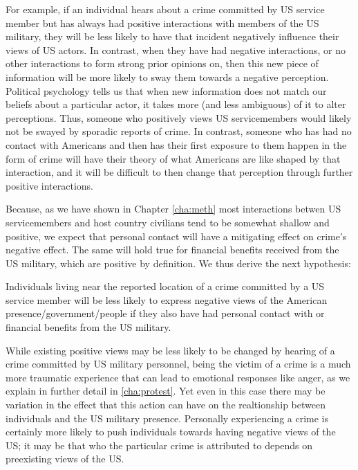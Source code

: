 For example, if an individual hears about a crime committed by US service member but has always had positive interactions with members of the US military, they will be less likely to have that incident negatively influence their views of US actors. In contrast, when they have had negative interactions, or no other interactions to form strong prior opinions on, then this new piece of information will be more likely to sway them towards a negative perception. Political psychology tells us that when new information does not match our beliefs about a particular actor, it takes more  (and less ambiguous) of it to alter perceptions. Thus, someone who positively views US servicemembers would likely not be swayed by sporadic reports of crime. In contrast, someone who has had no contact with Americans and then has their first exposure to them happen in the form of crime will have their theory of what Americans are like shaped by that interaction, and it will be difficult to then change that perception through further positive interactions.\cite{Jervis1968} 

Because, as we have shown in Chapter \ref{cha:meth} most interactions betwen US servicemembers and host country civilians tend to be somewhat shallow and positive, we expect that personal contact will have a mitigating effect on crime's negative effect. The same will hold true for financial benefits received from the US military, which are positive by definition. We thus derive the next hypothesis:

\begin{hyp}
	Individuals living near the reported location of a crime committed by a US service member will be less likely to express negative views of the American presence/government/people if they also have had personal contact with or financial benefits from the US military.  %
\end{hyp}

While existing positive views may be less likely to be changed by hearing of a crime committed by US military personnel, being the victim of a crime is a much more traumatic experience that can lead to emotional responses like anger, as we explain in further detail in \ref{cha:protest}. Yet even in this case there may be variation in the effect that this action can have on the realtionship between individuals and the US military presence. Personally experiencing a crime is certainly more likely to push individuals towards having negative views of the US; it may be that who the particular crime is attributed to depends on preexisting views of the US. 

